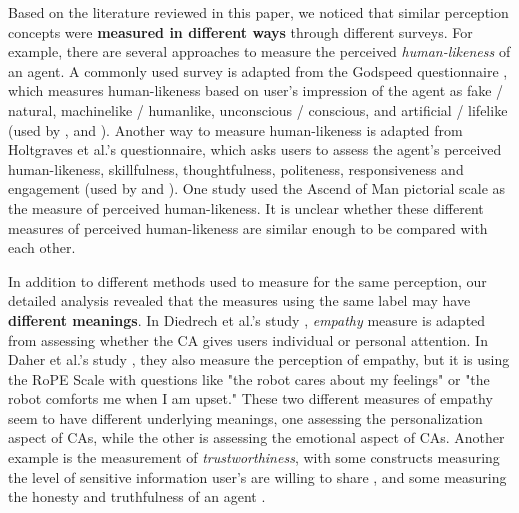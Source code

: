\documentclass[sigconf,screen,review, anonymous]{acmart}
\newcommand{\cmt}[1]{}%
\begin{document}
Based on the literature reviewed in this paper, we noticed that similar perception concepts were \textbf{measured in different ways} through different surveys. For example, there are several approaches to measure the perceived \textit{human-likeness} of an agent. A commonly used survey is adapted from the Godspeed questionnaire \cite{bartneck2009measurement}, which measures human-likeness based on user's impression of the agent as fake / natural, machinelike / humanlike, unconscious / conscious, and artificial / lifelike (used by \cite{hoegen2019end}\cmt{[31]}, \cite{jeong2019exploring}\cmt{[10]} and \cite{ouchi2019should}\cmt{[59]}). Another way to measure human-likeness is adapted from Holtgraves et al.'s \cite{holtgraves2007perceiving} questionnaire, which asks users to assess the agent's perceived human-likeness, skillfulness, thoughtfulness, politeness, responsiveness and engagement (used by \cite{diederich2019emulating}\cmt{[25]} and  \cite{gnewuch2018faster}\cmt{[19]}). One study \cite{westerman2019believe}\cmt{[9]} used the Ascend of Man pictorial scale \cite{kteily2015ascent} as the measure of perceived human-likeness. It is unclear whether these different measures of perceived human-likeness are similar enough to be compared with each other.

 In addition to different methods used to measure for the same perception, our detailed analysis revealed that the measures using the same label may have \textbf{different meanings}. In Diedrech et al.'s study \cite{diederich2019emulating}\cmt{[25]}, \textit{empathy} measure is adapted from \cite{yan2013role} assessing whether the CA gives users individual or personal attention. In Daher et al.'s study \cite{daher2020empathic}\cmt{[58]}, they also measure the perception of empathy, but it is using the RoPE Scale \cite{charrier2019rope} with questions like "the robot cares about my feelings" or "the robot comforts me when I am upset." These two different measures of empathy seem to have different underlying meanings, one assessing the personalization aspect of CAs, while the other is assessing the emotional aspect of CAs. Another example is the measurement of \textit{trustworthiness}, with some constructs measuring the level of sensitive information user's are willing to share \cite{dinev2006privacy}, and some measuring the honesty and truthfulness of an agent \cite{lee2017enhancing}. 
\end{document}
